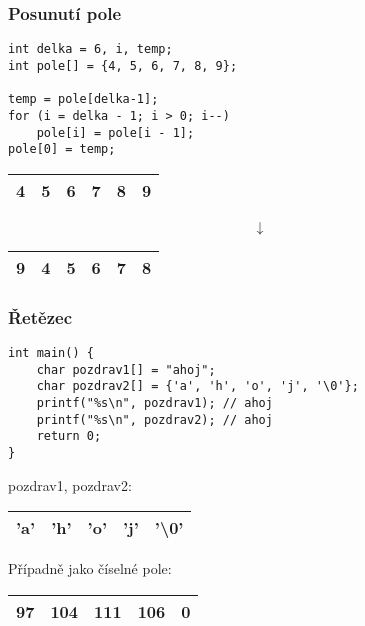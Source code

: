 \documentclass{beamer}
\begin{document}
\begin{frame}[t,fragile]\frametitle{Posunutí pole} 
\begin{verbatim} 
int delka = 6, i, temp;
int pole[] = {4, 5, 6, 7, 8, 9};

temp = pole[delka-1];
for (i = delka - 1; i > 0; i--) 
    pole[i] = pole[i - 1];
pole[0] = temp;
\end{verbatim}

\begin{center}
\begin{tabular}{|c|c|c|c|c|c|}
\hline 4&5&6&7&8&9 \\\hline
\end{tabular}
$$
\downarrow
$$
\begin{tabular}{|c|c|c|c|c|c|}
\hline 9&4&5&6&7&8 \\\hline
\end{tabular}
\end{center}
\end{frame}


\begin{frame}[t,fragile]\frametitle{Řetězec} 
\begin{verbatim} 
int main() {
    char pozdrav1[] = "ahoj";
    char pozdrav2[] = {'a', 'h', 'o', 'j', '\0'};
    printf("%s\n", pozdrav1); // ahoj
    printf("%s\n", pozdrav2); // ahoj
    return 0;     
}
\end{verbatim}

pozdrav1, pozdrav2: \\
\begin{center}
\begin{tabular}{|c|c|c|c|c|}
\hline 'a'&'h'&'o'&'j'&'\textbackslash0' \\\hline
\end{tabular}
\end{center}
\vskip 5mm
Případně jako číselné pole:\\
\begin{center}
\begin{tabular}{|c|c|c|c|c|}
\hline 97 &104 &111 &106 &0 \\\hline
\end{tabular}
\end{center}
\end{frame}
\end{document}
